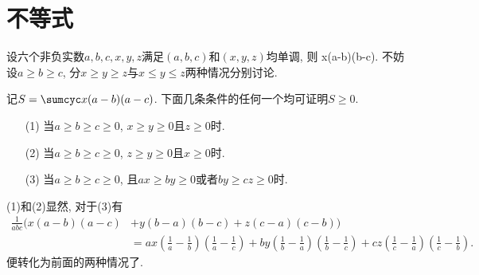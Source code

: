 \section{不等式}
设六个非负实数$a,b,c,x,y,z$满足$(a,b,c)$和$(x,y,z)$均单调, 则
\bee
\sumcyc x(a-b)(b-c).
\eee
\et
\ba
不妨设$a\ge b\ge c$, 分$x\ge y\ge z$与$x\le y\le z$两种情况分别讨论.
\ea

记$S=\sumcyc x(a-b)(a-c)$. 下面几条条件的任何一个均可证明$S\ge0$.
\begin{itemize}
 \item[(1)] 当$a\ge b\ge c\ge 0$, $x\ge y\ge 0$且$z\ge 0$时.
 \item[(2)] 当$a\ge b\ge c\ge 0$, $z\ge y\ge 0$且$x\ge 0$时.
 \item[(3)] 当$a\ge b\ge c\ge 0$, 且$ax\ge by\ge0$或者$by\ge cz\ge 0$时.
\end{itemize}
\ec
\ba
(1)和(2)显然, 对于(3)有
\begin{align*}
\frac{1}{abc}(x(a-b)(a-c) & +y(b-a)(b-c)+z(c-a)(c-b))\\
  & = ax\left(\frac1a-\frac1b\right)\left(\frac1a-\frac1c\right)
  +by\left(\frac1b-\frac1a\right)\left(\frac1b-\frac1c\right)+cz\left(\frac1c-\frac1a\right)\left(\frac1c-\frac1b\right).
\end{align*}
便转化为前面的两种情况了.
\ea
